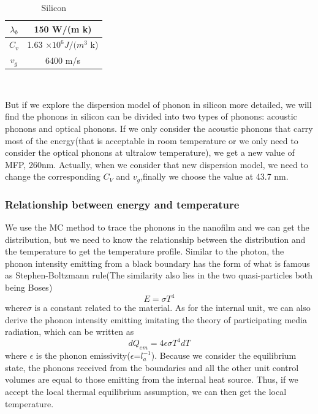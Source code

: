 \begin{table}[!hbp]
\centering
\begin{tabular}{|c|c|}
\hline $\lambda_{b}$  &150 W/(m k)\\
\hline $C_v$ & 1.63 $\times 10^6J/(m^3$ k) \\
\hline $v_g$&6400 m/s\\
\hline    
\end{tabular}\\
\caption{Silicon}
\end{table}

But if we explore the dispersion model of phonon in silicon more detailed, we will find the phonons in silicon can be divided into two types of phonons: acoustic phonons and optical phonons. If we only consider the acoustic phonons that carry most of the energy(that is acceptable in room temperature or we only need to consider the optical phonons at ultralow temperature), we get a new value of MFP, 260nm\cite{Super}. Actually, when we consider that new dispersion model, we need to change the corresponding $C_V$ and $v_g$,finally we choose the value at 43.7 nm\cite{hua1,hua2,hua3}.\\
\subsubsection{Relationship between energy and temperature}
We use the MC method to trace the phonons in the nanofilm and we can get the distribution, but we need to know the relationship between the distribution and the temperature to get the temperature profile.
Similar to the photon, the phonon intensity emitting from a black boundary has the form of what is famous as Stephen-Boltzmann rule\cite{HT}(The similarity also lies in the two quasi-particles both being Boses)
\begin{equation} \label{eq3}
E=\sigma T^4
\end{equation}
where$\sigma$ is a constant related to the material.
As for the internal unit, we can also derive the phonon intensity emitting imitating the theory of participating media radiation\cite{Thermal}, which can be written as
\begin{equation} \label{eq4}
dQ_{em}=4\epsilon \sigma T^4 dT
\end{equation}
where $\epsilon$ is the phonon emissivity($\epsilon$=$l^{-1}_a$). Because we consider the equilibrium state, the phonons received from the boundaries and all the other unit control volumes are equal to those emitting from the internal heat source. Thus, if we accept the local thermal equilibrium assumption, we can then get the local temperature.\\
